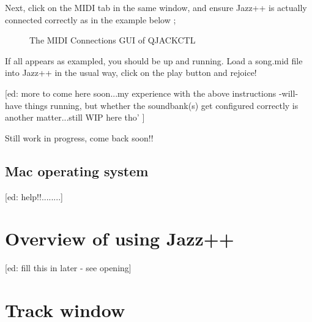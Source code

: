 \documentclass[letterpaper]{report}
\begin{document}
Next, click on the MIDI tab in the same window, and ensure Jazz++ is
actually connected correctly as in the example below ;



\begin{figure}%
% 
\caption{The MIDI Connections GUI of QJACKCTL}
\end{figure}



If all appears as exampled, you should be up and running. Load a song.mid
file into Jazz++ in the usual way, click on the play button and rejoice!



[ed: more to come here soon...my experience with the above instructions
-will- have things running, but whether the soundbank(s) get configured
correctly is another matter...still WIP here tho' ]


Still work in progress, come back soon!!



\section{Mac operating system}

[ed: help!!........]



\chapter{Overview of using Jazz++}\label{jazzwin}

[ed: fill this in later - see opening]

\chapter{Track window}\label{trackwin}
\end{document}
